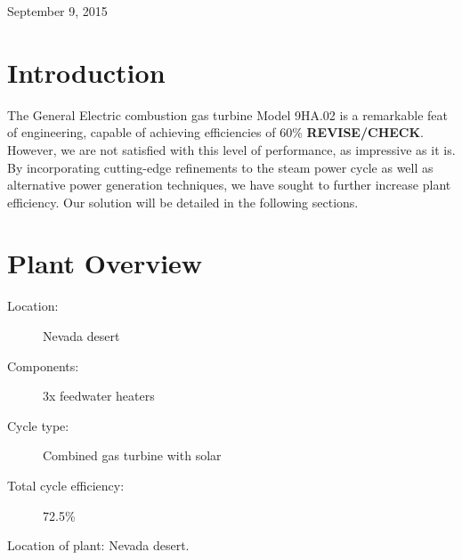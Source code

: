 \documentclass[12pt,letterpaper,notitlepage]{article}
\begin{document}
\begin{titlepage}


{\large September 9, 2015}\\[3cm] %




\vfill %

\end{titlepage}
\section{Introduction}
\label{sec:introduction}
The General Electric combustion gas turbine Model 9HA.02 is a remarkable feat of engineering, capable of achieving efficiencies of 60\% \textbf{REVISE/CHECK}. However, we are not satisfied with this level of performance, as impressive as it is. By incorporating cutting-edge refinements to the steam power cycle as well as alternative power generation techniques, we have sought to further increase plant efficiency. Our solution will be detailed in the following sections.
\section{Plant Overview}
\label{sec:plantOverview}
\begin{description}
  \item[Location:] Nevada desert\\
  \item[Components:] 3x feedwater heaters\\
  \item[Cycle type:] Combined gas turbine with solar\\
  \item[Total cycle efficiency:] 72.5\%\\
\end{description}
Location of plant: Nevada desert.
\end{document}

